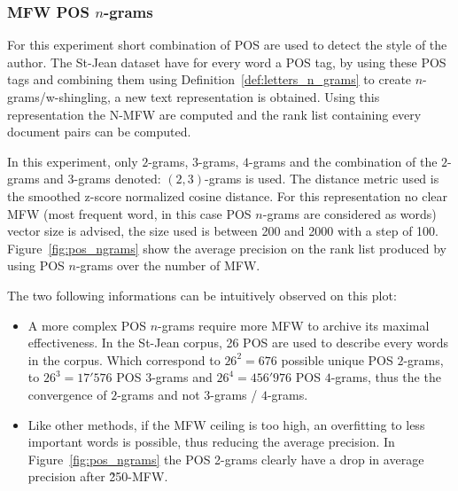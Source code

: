 \subsubsection{MFW POS $n$-grams}

For this experiment short combination of POS are used to detect the style of the author.
The St-Jean dataset have for every word a POS tag, by using these POS tags and combining them using Definition~\ref{def:letters_n_grams} to create $n$-grams/w-shingling, a new text representation is obtained.
Using this representation the N-MFW are computed and the rank list containing every document pairs can be computed.

In this experiment, only $2$-grams, $3$-grams, $4$-grams and the combination of the $2$-grams and $3$-grams denoted: $(2, 3)$-grams is used.
The distance metric used is the smoothed z-score normalized cosine distance.
For this representation no clear MFW (most frequent word, in this case POS $n$-grams are considered as words) vector size is advised, the size used is between 200 and 2000 with a step of 100.
Figure~\ref{fig:pos_ngrams} show the average precision on the rank list produced by using POS $n$-grams over the number of MFW.

The two following informations can be intuitively observed on this plot:
\begin{itemize}
  \item
  A more complex POS $n$-grams require more MFW to archive its maximal effectiveness.
  In the St-Jean corpus, 26 POS are used to describe every words in the corpus.
  Which correspond to $26^2 = 676$ possible unique POS $2$-grams, to $26^3 = 17'576$ POS $3$-grams and $26^4 = 456'976$ POS $4$-grams, thus the the convergence of $2$-grams and not $3$-grams / $4$-grams.
  \item
  Like other methods, if the MFW ceiling is too high, an overfitting to less important words is possible, thus reducing the average precision.
  In Figure~\ref{fig:pos_ngrams} the POS 2-grams clearly have a drop in average precision after \~250-MFW.
\end{itemize}

